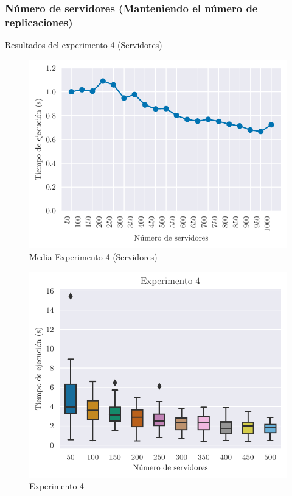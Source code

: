 \subsubsection{Número de servidores (Manteniendo el número de replicaciones)}

\begin{table}[H]
    \caption{Resultados del experimento 4 (Servidores)}%
    \label{tab:ex4s}
    \begin{center}
    
    \end{center}
\end{table}

\begin{figure}[H]
    \centering
    \includegraphics{include/plots/ex4_s_mean_time.pdf}
    \caption{Media Experimento 4 (Servidores)}%
    \label{fig:ex4s_mean}
\end{figure}

\begin{figure}[H]
    \centering
    \includegraphics{include/plots/ex4_s_time_bplot_cut.pdf}
    \caption{Experimento 4}%
    \label{fig:ex4s}
\end{figure}

